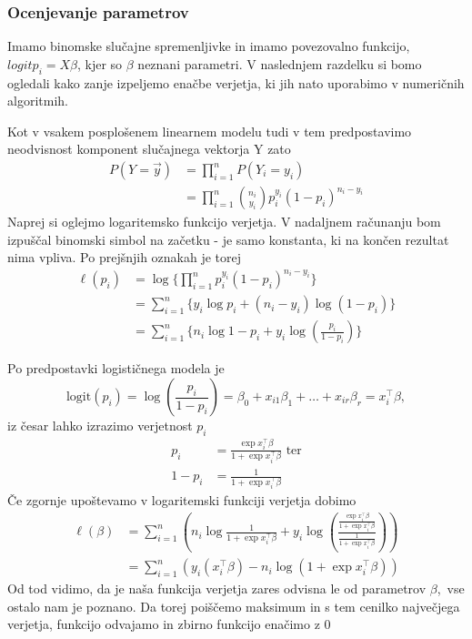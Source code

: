 \documentclass[12pt,a4paper]{amsart}
\theoremstyle{definition} %
\theoremstyle{plain} %
\begin{document}
\subsubsection{Ocenjevanje parametrov}\label{ocenpar}
Imamo binomske slučajne spremenljivke in imamo povezovalno funkcijo, $\mathrm{}{logit p_{i}} = X\beta$, kjer so $\beta$ neznani parametri.
V naslednjem razdelku si bomo ogledali kako zanje izpeljemo enačbe verjetja, ki jih nato uporabimo v numeričnih algoritmih.

Kot v vsakem posplošenem linearnem modelu tudi v tem predpostavimo neodvisnost komponent slučajnega vektorja $\mathrm{Y}$ zato 
\begin{align*}
    P(Y = \vec{y}) &= \prod_{i=1}^{n} P(Y_{i} = y_{i}) \\
                    &=\prod_{i=1}^{n} {n_{i} \choose y_{i}} p_{i}^{y_{i}}(1 - p_{i})^{n_{i} - y_{i}}
\end{align*}
Naprej si oglejmo logaritemsko funkcijo verjetja. V nadaljnem računanju bom izpuščal binomski simbol na začetku - je samo konstanta, ki na
končen rezultat nima vpliva. Po prejšnjih oznakah je torej
\begin{align}\label{logit1}
    \ell(p_{i}) &= \log\{\prod_{i=1}^{n} p_{i}^{y_{i}}(1 - p_{i})^{n_{i} - y_{i}} \} \nonumber  \\
        &= \sum_{i=1}^{n}\{y_{i}\log{p_{i}} + (n_{i} - y_{i})\log(1 - p_{i})\} \nonumber \\
        &= \sum_{i=1}^{n}\{n_{i}\log{1-p_{i}}  + y_{i}\log{\left(\frac{p_{i}}{1-p_{i}}\right)}\}
\end{align}

Po predpostavki logističnega modela je 
\[
   \mathrm{logit}(p_{i}) = \log\left( \frac{p_{i}}{1-p_{i}}  \right) = \beta_{0} + x_{i1}\beta_{1} + \ldots + x_{ir}\beta_{r} = x_{i}^\top \beta,
\]
iz česar lahko izrazimo verjetnost $p_{i}$
\begin{align}
    p_{i} &= \frac{\exp{x_{i}^{\top} \beta}}{1 + \exp{x_{i}^\top\beta}} \text{~ter} \\
    1 - p_{i} &= \frac{1}{1 + \exp{x_{i}^\top\beta}}
\end{align}
Če zgornje upoštevamo v logaritemski funkciji verjetja dobimo
\begin{align}
    \ell(\beta) &= \sum_{i=1}^{n}\left( n_{i}\log{\frac{1}{1 + \exp{x_{i}^\top\beta}}}  + y_{i}\log{\left( \frac{\frac{\exp{x_{i}^{\top} \beta}}{1 + \exp{x_{i}^\top\beta}}}{\frac{1}{1 + \exp{x_{i}^\top\beta}}}  \right)} \right) \nonumber\\
                &= \sum_{i=1}^{n}\left( y_{i}(x_{i}^\top\beta) - n_{i}\log(1 + \exp{x_{i}^\top\beta})           \right)
\end{align}
Od tod vidimo, da je naša funkcija verjetja zares odvisna le od parametrov $\beta$,~vse ostalo nam je poznano. Da torej poiščemo maksimum in s tem
cenilko največjega verjetja, funkcijo odvajamo in zbirno funkcijo enačimo z 0
\end{document}
